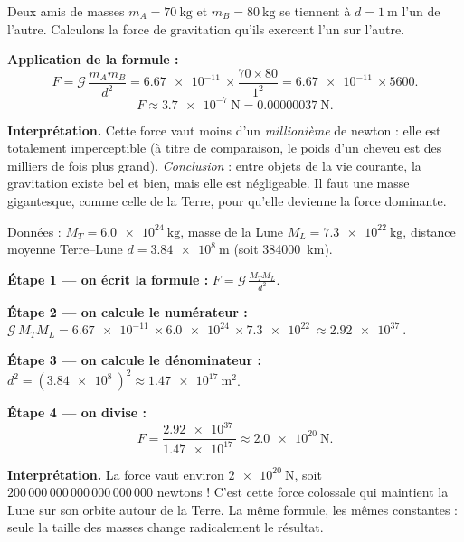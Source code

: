 \documentclass[11pt,a4paper]{article}
\newcommand{\Grav}{\mathcal{G}}        %
\begin{document}
\begin{exemple}
Deux amis de masses $m_A=\SI{70}{\kilogram}$ et $m_B=\SI{80}{\kilogram}$ se tiennent à
$d=\SI{1}{\metre}$ l'un de l'autre. Calculons la force de gravitation qu'ils exercent
l'un sur l'autre.

\smallskip
\textbf{Application de la formule :}
\[
F=\Grav\,\frac{m_A m_B}{d^2}
 =\SI{6.67e-11}{}\times\frac{70\times 80}{1^2}
 =\SI{6.67e-11}{}\times 5600 .
\]
\[
F \approx \SI{3.7e-7}{\newton}=\SI{0.00000037}{\newton}.
\]

\textbf{Interprétation.} Cette force vaut moins d'un \emph{millionième} de newton :
elle est totalement imperceptible (à titre de comparaison, le poids d'un cheveu est
des milliers de fois plus grand). \emph{Conclusion} : entre objets de la vie courante,
la gravitation existe bel et bien, mais elle est négligeable. Il faut une masse
gigantesque, comme celle de la Terre, pour qu'elle devienne la force dominante.
\end{exemple}

\begin{exemple}
Données : $M_T=\SI{6.0e24}{\kilogram}$, masse de la Lune
$M_L=\SI{7.3e22}{\kilogram}$, distance moyenne Terre--Lune
$d=\SI{3.84e8}{\metre}$ (soit \SI{384000}{\kilo\metre}).

\smallskip
\textbf{Étape 1 --- on écrit la formule :} $\displaystyle F=\Grav\,\frac{M_T M_L}{d^2}$.

\textbf{Étape 2 --- on calcule le numérateur :}
$\Grav\,M_T M_L=\SI{6.67e-11}{}\times \SI{6.0e24}{}\times\SI{7.3e22}{}
\approx \SI{2.92e37}{}$.

\textbf{Étape 3 --- on calcule le dénominateur :}
$d^2=(\SI{3.84e8}{})^2\approx \SI{1.47e17}{\metre\squared}$.

\textbf{Étape 4 --- on divise :}
\[
F=\frac{\SI{2.92e37}{}}{\SI{1.47e17}{}}\approx\SI{2.0e20}{\newton}.
\]

\textbf{Interprétation.} La force vaut environ $\SI{2e20}{\newton}$, soit
$200\,000\,000\,000\,000\,000\,000$ newtons ! C'est cette force colossale qui maintient
la Lune sur son orbite autour de la Terre. La même formule, les mêmes constantes :
seule la taille des masses change radicalement le résultat.
\end{exemple}

\end{document}
